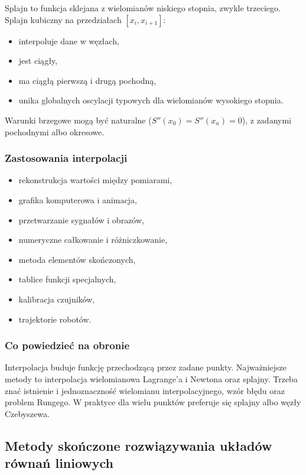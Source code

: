Splajn to funkcja sklejana z wielomianów niskiego stopnia, zwykle trzeciego. Splajn kubiczny na przedziałach $[x_i,x_{i+1}]$:
\begin{itemize}
  \item interpoluje dane w węzłach,
  \item jest ciągły,
  \item ma ciągłą pierwszą i drugą pochodną,
  \item unika globalnych oscylacji typowych dla wielomianów wysokiego stopnia.
\end{itemize}

Warunki brzegowe mogą być naturalne ($S''(x_0)=S''(x_n)=0$), z zadanymi pochodnymi albo okresowe.

\subsubsection{Zastosowania interpolacji}

\begin{itemize}
  \item rekonstrukcja wartości między pomiarami,
  \item grafika komputerowa i animacja,
  \item przetwarzanie sygnałów i obrazów,
  \item numeryczne całkowanie i różniczkowanie,
  \item metoda elementów skończonych,
  \item tablice funkcji specjalnych,
  \item kalibracja czujników,
  \item trajektorie robotów.
\end{itemize}

\subsubsection{Co powiedzieć na obronie}

Interpolacja buduje funkcję przechodzącą przez zadane punkty. Najważniejsze metody to interpolacja wielomianowa Lagrange'a i Newtona oraz splajny. Trzeba znać istnienie i jednoznaczność wielomianu interpolacyjnego, wzór błędu oraz problem Rungego. W praktyce dla wielu punktów preferuje się splajny albo węzły Czebyszewa.

\subsection{Metody skończone rozwiązywania układów równań liniowych}

